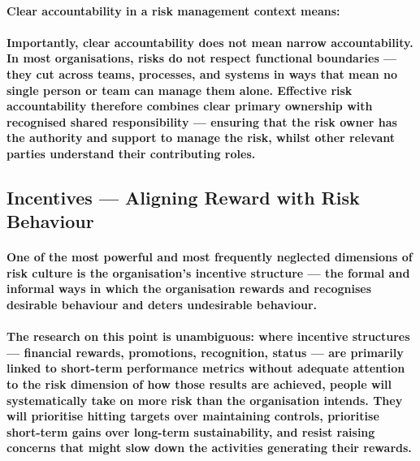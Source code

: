 \paragraph{Clear accountability in a risk management context means:}
\begin{itemize}
\end{itemize}
\paragraph{Importantly, clear accountability does not mean narrow accountability. In most organisations, risks do not respect functional boundaries — they cut across teams, processes, and systems in ways that mean no single person or team can manage them alone. Effective risk accountability therefore combines clear primary ownership with recognised shared responsibility — ensuring that the risk owner has the authority and support to manage the risk, whilst other relevant parties understand their contributing roles.}

\subsection{Incentives — Aligning Reward with Risk Behaviour}
\paragraph{One of the most powerful and most frequently neglected dimensions of risk culture is the organisation's \textbf{incentive structure} — the formal and informal ways in which the organisation rewards and recognises desirable behaviour and deters undesirable behaviour.}
\paragraph{The research on this point is unambiguous: where incentive structures — financial rewards, promotions, recognition, status — are primarily linked to short-term performance metrics without adequate attention to the risk dimension of how those results are achieved, people will systematically take on more risk than the organisation intends. They will prioritise hitting targets over maintaining controls, prioritise short-term gains over long-term sustainability, and resist raising concerns that might slow down the activities generating their rewards.}

